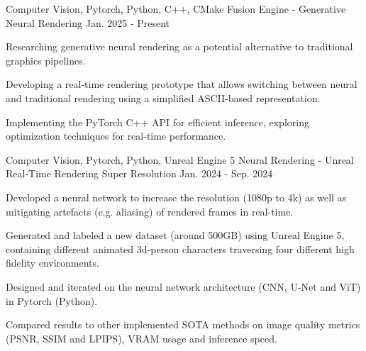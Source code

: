 

\begin{cventries}

  \cventry
    {Computer Vision, Pytorch, Python, C++, CMake} %
    {Fusion Engine - Generative Neural Rendering} %
    {\href{https://github.com/BrandnerKasper/FusionEngine}{\faGithubSquare}} %
    {Jan. 2025 - Present} %
    {
      \begin{cvitems} %
        \item {Researching generative neural rendering as a potential alternative to traditional graphics pipelines.}
        \item {Developing a real-time rendering prototype that allows switching between neural and traditional rendering using a simplified ASCII-based representation.}
        \item {Implementing the PyTorch C++ API for efficient inference, exploring optimization techniques for real-time performance.}
      \end{cvitems}
    }

  \cventry
    {Computer Vision, Pytorch, Python, Unreal Engine 5} %
    {Neural Rendering - Unreal Real-Time Rendering Super Resolution} %
    {\href{https://github.com/BrandnerKasper/URTSR}{\faGithubSquare}} %
    {Jan. 2024 - Sep. 2024} %
    {
      \begin{cvitems} %
        \item {Developed a neural network to increase the resolution (1080p to 4k) as well as mitigating artefacts (e.g. aliasing) of rendered frames in real-time.}
        \item {Generated and labeled a new dataset (around 500GB) using Unreal Engine 5, containing different animated 3d-person characters traversing four different high fidelity environments.}
        \item {Designed and iterated on the neural network architecture (CNN, U-Net and ViT) in Pytorch (Python).}
        \item {Compared results to other implemented SOTA methods on image quality metrics (PSNR, SSIM and LPIPS), VRAM usage and inference speed.}
      \end{cvitems}
    }


\end{cventries}
